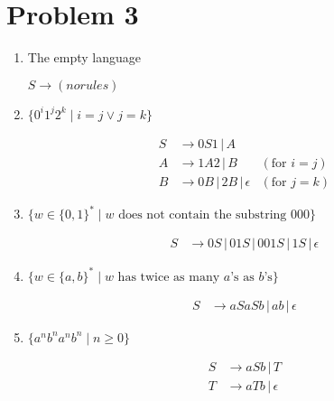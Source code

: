 \documentclass{article}
\begin{document}
\section*{Problem 3}
\begin{enumerate}[label=(\alph*)]
  \item The empty language
    \begin{shaded}
      $S \rightarrow (no rules)$
    \end{shaded}

  \item $\{ 0^i1^j2^k \mid i=j \lor j=k \}$
    \begin{shaded}
      \begin{align*}
        S &\rightarrow 0S1 \,|\, A \\
        A &\rightarrow 1A2 \,|\, B                &(\text{for } i=j) \\
        B &\rightarrow 0B \,|\, 2B \,|\, \epsilon &(\text{for } j=k)
      \end{align*}
    \end{shaded}

  \item $\{ w \in \{0,1\}^* \mid w \textrm{ does not contain the substring 000} \}$
    \begin{shaded}
      \begin{align*}
        S &\rightarrow 0S \,|\, 01S \,|\, 001S \,|\, 1S \,|\, \epsilon
      \end{align*}
    \end{shaded}

  \item $\{ w \in \{a,b\}^* \mid w \textrm{ has twice as many $a$'s as $b$'s} \}$
    \begin{shaded}
      \begin{align*}
        S &\rightarrow aSaSb \,|\, ab \,|\, \epsilon
      \end{align*}
    \end{shaded}

  \item $\{ a^nb^na^nb^n \mid n \geq 0 \}$
    \begin{shaded}
      \begin{align*}
        S &\rightarrow aSb \,|\, T \\
        T &\rightarrow aTb \,|\, \epsilon
      \end{align*}  
    \end{shaded}
\end{enumerate}
\end{document}
